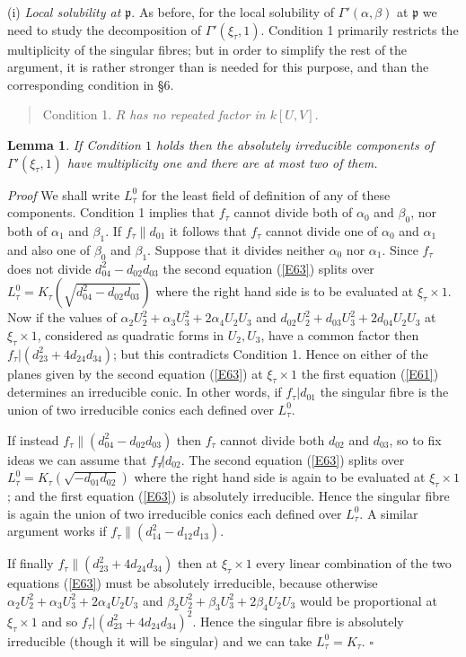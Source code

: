 \documentclass[12pt]{article}
\def\fp{{\mathfrak p}}
\def\ga{{\alpha}}
\def\gb{{\beta}}
\def\gG{{\Gamma}}
\def\qed{{\hfill$\square$}}
\def\ble{\begin{lemma} \label}
\def\ele{\end{lemma}}
\newtheorem{lemma}{Lemma}
\begin{document}
\noindent (i) \emph{Local solubility at $\fp$}. As before, for
the local solubility of $\gG'(\ga,\gb)$ at $\fp$ we need to
study the decomposition of $\gG'(\xi_\tau,1)$.
Condition 1 primarily restricts the multiplicity of the
singular fibres; but in order to simplify the rest of the
argument, it is rather stronger than is needed for this
purpose, and than the corresponding condition in \S6.
\begin{quote} Condition 1. \emph{$R$ has no repeated factor
in $k[U,V]$}.
\end{quote}
\ble{L23} If Condition $1$ holds then the absolutely
irreducible components of $\gG'(\xi_\tau,1)$ have
multiplicity one and there are at most two of them.
\ele
\emph{Proof} We shall write $L^0_\tau$ for the least field of
definition of any of these components. Condition 1 implies
that $f_\tau$ cannot divide both of $\ga_0$ and $\gb_0$, nor
both of $\ga_1$ and $\gb_1$. If $f_\tau\|d_{01}$ it follows
that $f_\tau$ cannot divide one of $\ga_0$ and $\ga_1$ and
also one of $\gb_0$ and $\gb_1$. Suppose that it divides
neither $\ga_0$ nor $\ga_1$. Since $f_\tau$ does not divide
$d_{04}^2-d_{02}d_{03}$ the second equation (\ref{E63})
splits over $L^0_\tau=K_\tau(\sqrt{d_{04}^2-d_{02}d_{03}})$
where the right hand side is to be evaluated at $\xi_\tau
\times1$. Now if the values of $\ga_2U_2^2+\ga_3U_3^2
+2\ga_4U_2U_3$ and $d_{02}U_2^2+d_{03}U_3^2+2d_{04}U_2U_3$
at $\xi_\tau\times1$, considered as quadratic forms in
$U_2,U_3$, have a common factor then $f_\tau|(d_{23}^2+
4d_{24}d_{34})$; but this contradicts Condition 1. Hence on
either of the planes given by the second equation (\ref{E63})
at $\xi_\tau\times1$ the first equation (\ref{E61}) determines
an irreducible conic. In other words, if $f_\tau|d_{01}$ the
singular fibre is the union of two irreducible conics each
defined over $L^0_\tau$.

If instead $f_\tau\|(d_{04}^2-d_{02}d_{03})$ then $f_\tau$
cannot divide both $d_{02}$ and $d_{03}$, so to fix ideas we
can assume that $f_\tau{\not|}d_{02}$. The second equation
(\ref{E63}) splits over $L^0_\tau=K_\tau(\sqrt{-d_{01}d_{02}})$
where the right hand side is again to be evaluated at
$\xi_\tau\times1$; and the first equation (\ref{E63}) is absolutely irreducible. Hence the singular fibre is again the union
of two irreducible conics each defined over $L^0_\tau$. A
similar argument works if $f_\tau\|(d_{14}^2-d_{12}d_{13})$.

If finally $f_\tau\|(d_{23}^2+4d_{24}d_{34})$ then at
$\xi_\tau\times1$ every linear combination of the two
equations (\ref{E63}) must be absolutely irreducible, because
otherwise $\ga_2U_2^2+\ga_3U_3^2+2\ga_4U_2U_3$ and
$\gb_2U_2^2+\gb_3U_3^2+2\gb_4U_2U_3$ would be proportional at
$\xi_\tau\times1$ and so $f_\tau|(d_{23}^2+4d_{24}d_{34})^2$.
Hence the singular fibre is absolutely irreducible (though it
will be singular) and we can take $L^0_\tau=K_\tau$.  \qed
\end{document}
